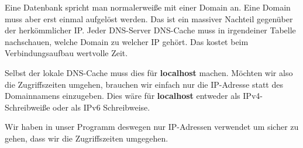 Eine Datenbank spricht man normalerweiße mit einer Domain an. 
Eine Domain muss aber erst einmal aufgelöst werden.
Das ist ein massiver Nachteil gegenüber der herkömmlicher IP. Jeder
DNS-Server \bzw DNS-Cache muss in irgendeiner Tabelle nachschauen, welche Domain
zu welcher IP gehört. Das kostet beim Verbindungsaufbau wertvolle Zeit.

Selbst der lokale DNS-Cache muss dies \zB für \textbf{localhost} machen.
Möchten wir also die Zugriffszeiten umgehen, brauchen wir einfach nur die IP-Adresse
statt des Domainnamens einzugeben. Dies wäre für \textbf{localhost} entweder  als
IPv4-Schreibweiße oder \gqq{[::1]} als IPv6 Schreibweise.

Wir haben in unser Programm deswegen nur IP-Adressen verwendet um sicher zu gehen, dass wir 
die Zugriffszeiten umgegehen.
\clearpage